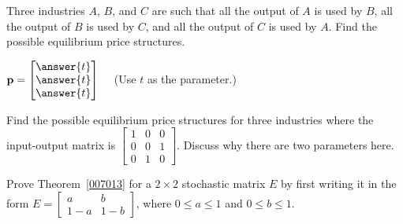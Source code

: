 \documentclass{ximera}
\begin{document}
\begin{problem}\label{prob:i/o_5}
Three industries $A$, $B$, and $C$ are such that all the output of $A$ is used by $B$, all the output of $B$ is used by $C$, and all the output of $C$ is used by $A$. Find the possible equilibrium price structures.


${\bf p}=\begin{bmatrix}
\answer{t} \\
\answer{t} \\
\answer{t}
\end{bmatrix} \quad$ (Use $t$ as the parameter.)

\end{problem}

\begin{problem}\label{prob:i/o_6}
Find the possible equilibrium price structures for three industries where the input-output matrix is $\begin{bmatrix}
1 & 0 & 0 \\
0 & 0 & 1 \\
0 & 1 & 0
\end{bmatrix}$. Discuss why there are two parameters here.
\end{problem}

\begin{problem}
Prove Theorem~\ref{007013} for a $2 \times 2$ stochastic matrix $E$ by first writing it in the form $E = \begin{bmatrix}
a & b \\
1 - a & 1 - b
\end{bmatrix}$, where $0 \leq a \leq 1$ and $0 \leq b \leq 1$.

\end{problem}
\end{document}
